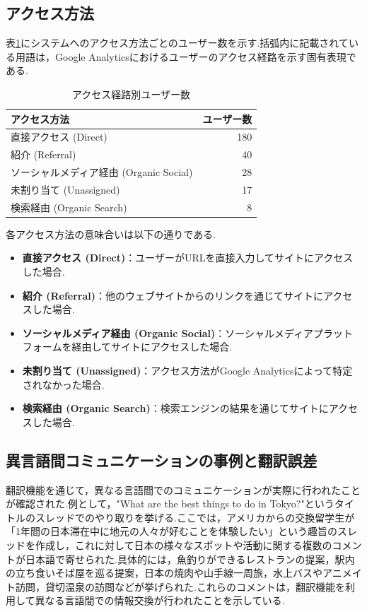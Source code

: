 \documentclass[b5paper,12pt,dvipdfmx]{jsreport}
\begin{document}
\subsection{アクセス方法}
表\ref{table:access-methods}にシステムへのアクセス方法ごとのユーザー数を示す.括弧内に記載されている用語は，Google Analyticsにおけるユーザーのアクセス経路を示す固有表現である.

\begin{table}[H]
    \centering
    \caption{アクセス経路別ユーザー数}
    \label{table:access-methods}
    \begin{tabular}{|l|r|}
        \hline
        \textbf{アクセス方法} & \textbf{ユーザー数} \\
        \hline
        直接アクセス (Direct) & 180 \\
        紹介 (Referral) & 40 \\
        ソーシャルメディア経由 (Organic Social) & 28 \\
        未割り当て (Unassigned) & 17 \\
        検索経由 (Organic Search) & 8 \\
        \hline
    \end{tabular}
\end{table}

各アクセス方法の意味合いは以下の通りである.
\begin{itemize}
    \item \textbf{直接アクセス (Direct)}：ユーザーがURLを直接入力してサイトにアクセスした場合.
    \item \textbf{紹介 (Referral)}：他のウェブサイトからのリンクを通じてサイトにアクセスした場合.
    \item \textbf{ソーシャルメディア経由 (Organic Social)}：ソーシャルメディアプラットフォームを経由してサイトにアクセスした場合.
    \item \textbf{未割り当て (Unassigned)}：アクセス方法がGoogle Analyticsによって特定されなかった場合.
    \item \textbf{検索経由 (Organic Search)}：検索エンジンの結果を通じてサイトにアクセスした場合.
\end{itemize}


\subsection{異言語間コミュニケーションの事例と翻訳誤差}
翻訳機能を通じて，異なる言語間でのコミュニケーションが実際に行われたことが確認された.例として，"What are the best things to do in Tokyo?"というタイトルのスレッドでのやり取りを挙げる.ここでは，アメリカからの交換留学生が「1年間の日本滞在中に地元の人々が好むことを体験したい」という趣旨のスレッドを作成し，これに対して日本の様々なスポットや活動に関する複数のコメントが日本語で寄せられた.具体的には，魚釣りができるレストランの提案，駅内の立ち食いそば屋を巡る提案，日本の焼肉や山手線一周旅，水上バスやアニメイト訪問，貸切温泉の訪問などが挙げられた.これらのコメントは，翻訳機能を利用して異なる言語間での情報交換が行われたことを示している.
\end{document}
